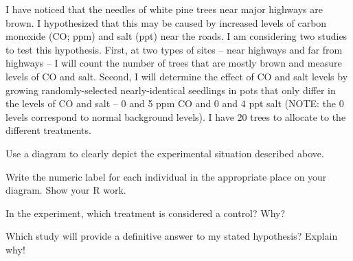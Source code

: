 \documentclass[10pt,openany]{book}\usepackage[]{graphicx}\usepackage[]{color}
\begin{document}
\begin{exsection}
  \item \label{revex:ExpDPine} I have noticed that the needles of white pine trees near major highways are brown.  I hypothesized that this may be caused by increased levels of carbon monoxide (CO; ppm) and salt (ppt) near the roads.  I am considering two studies to test this hypothesis.  First, at two types of sites -- near highways and far from highways -- I will count the number of trees that are mostly brown and measure levels of CO and salt.  Second, I will determine the effect of CO and salt levels by growing randomly-selected nearly-identical seedlings in pots that only differ in the levels of CO and salt -- 0 and 5 ppm CO and 0 and 4 ppt salt (NOTE: the 0 levels correspond to normal background levels).  I have 20 trees to allocate to the different treatments. 
\begin{Enumerate}
  \item Use a diagram to clearly depict the experimental situation described above.
  \item \rhw{} Write the numeric label for each individual in the appropriate place on your diagram.  Show your R work.
  \item In the experiment, which treatment is considered a control?  Why?
  \item Which study will provide a definitive answer to my stated hypothesis?  Explain why!
\end{Enumerate}

\end{exsection}
\end{document}
